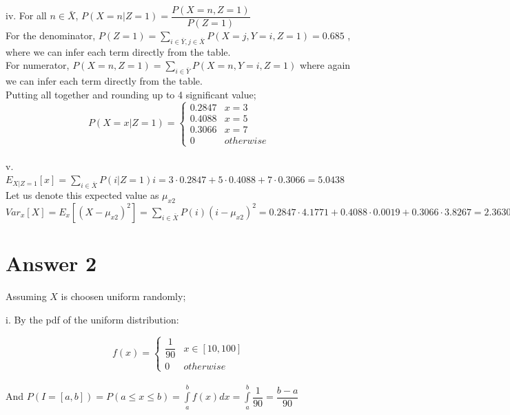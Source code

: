 \documentclass[12pt]{article}
\begin{document}
    iv.
	For all $n\in \bar{X}$,	$P( X = n | Z=1) = \dfrac{P(X=n, Z=1)  }{P(Z=1)}$ \\
	
	For the denominator, $P(Z=1) = \sum_{i\in \bar{Y},j\in \bar{X}  } P(X=j,Y=i,Z=1)= 0.685$ , where we can infer each term directly from the table. \\
	
	For numerator, $P(X=n, Z=1) =  \sum_{i\in \bar{Y}} P(X=n,Y=i,Z=1)$ where again we can infer each term directly from the table. \\
	
	Putting all together and rounding up to 4 significant value; 
	\[ P(X =x | Z = 1 ) = \begin{cases} 
       0.2847 & x = 3 \\
      0.4088 & x=5 \\
      0.3066 & x=7 \\
      0 & otherwise 
   \end{cases}
\] \\

       v.
    $E_{X|Z=1}[x] = \sum_{i\in\bar{X}} P(i|Z=1)i = 3 \cdot 0.2847+ 5\cdot 0.4088+ 7\cdot 0.3066 = 5.0438 $ \\
    
    Let us denote this expected value as $\mu_{x2}$ \\
    
    $Var_x[X] = E_x[ (X - \mu_{x2})^2 ] = \sum_{i\in\bar{X}} P( i )(i-\mu_{x2})^2 = 0.2847\cdot 4.1771 + 0.4088\cdot 0.0019 + 0.3066 \cdot 3.8267 = 2.3630$ \\
    
\section*{Answer 2}

Assuming $X$ is choosen uniform randomly;

i. By the pdf of the uniform distribution:

	\[ f( x ) = \begin{cases} 
       \dfrac{1}{90} & x \in [10,100] \\
      0 & otherwise 
   \end{cases}
\] \\
And $P(I=[a,b]) = P(a\leq x \leq b) = \displaystyle\int\limits_a^b  f(x)dx = \displaystyle\int\limits_a^b   \dfrac{1}{90} = \dfrac{b-a}{90} $ \\
\end{document}
